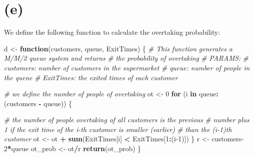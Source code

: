 \documentclass[]{article}
\newenvironment{Shaded}{\begin{snugshade}}{\end{snugshade}}
\newcommand{\CommentTok}[1]{\textcolor[rgb]{0.56,0.35,0.01}{\textit{#1}}}
\newcommand{\ControlFlowTok}[1]{\textcolor[rgb]{0.13,0.29,0.53}{\textbf{#1}}}
\newcommand{\DataTypeTok}[1]{\textcolor[rgb]{0.13,0.29,0.53}{#1}}
\newcommand{\DecValTok}[1]{\textcolor[rgb]{0.00,0.00,0.81}{#1}}
\newcommand{\KeywordTok}[1]{\textcolor[rgb]{0.13,0.29,0.53}{\textbf{#1}}}
\newcommand{\NormalTok}[1]{#1}
\newcommand{\OperatorTok}[1]{\textcolor[rgb]{0.81,0.36,0.00}{\textbf{#1}}}
\newcommand{\StringTok}[1]{\textcolor[rgb]{0.31,0.60,0.02}{#1}}
\begin{document}
\begin{Shaded}
\end{Shaded}

\hypertarget{e}{%
\section{(e)}\label{e}}

We define the following function to calculate the overtaking
probability:

\begin{Shaded}
\begin{Highlighting}[]
\NormalTok{d <-}\StringTok{ }\ControlFlowTok{function}\NormalTok{(customers, queue, ExitTimes) \{}
  \CommentTok{# This function generates a M/M/2 queue system and returns }
  \CommentTok{# the probability of overtaking}
  \CommentTok{# PARAMS:}
  \CommentTok{# customers:   number of customers in the supermarket}
  \CommentTok{# queue:       number of people in the quene}
  \CommentTok{# ExitTimes:   the exited times of each customer}

  \CommentTok{# we define the number of people of overtaking}
\NormalTok{  ot <-}\StringTok{ }\DecValTok{0}
  \ControlFlowTok{for}\NormalTok{ (i }\ControlFlowTok{in}\NormalTok{ queue}\OperatorTok{:}\NormalTok{(customers }\OperatorTok{-}\StringTok{ }\NormalTok{queue)) \{}

    \CommentTok{# the number of people overtaking of all customers is the previous }
    \CommentTok{# number plus 1 if the exit time of the i-th customer is smaller (earlier) }
    \CommentTok{# than the (i-1)th customer }
\NormalTok{    ot <-}\StringTok{ }\NormalTok{ot }\OperatorTok{+}\StringTok{ }\KeywordTok{sum}\NormalTok{(ExitTimes[i] }\OperatorTok{<}\StringTok{ }\NormalTok{ExitTimes[}\DecValTok{1}\OperatorTok{:}\NormalTok{(i}\DecValTok{-1}\NormalTok{)])}
\NormalTok{  \}}
\NormalTok{  r <-}\StringTok{ }\NormalTok{customers}\DecValTok{-2}\OperatorTok{*}\NormalTok{queue}
\NormalTok{  ot_prob <-}\StringTok{ }\NormalTok{ot}\OperatorTok{/}\NormalTok{r}
  \KeywordTok{return}\NormalTok{(ot_prob)}
\NormalTok{\}}
\end{Highlighting}
\end{Shaded}
\end{document}

